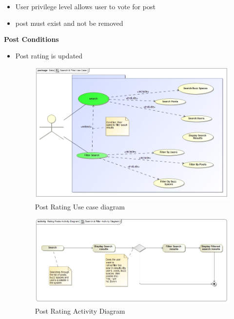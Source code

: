 \documentclass[11pt]{article}
\begin{document}
\begin{enumerate}
\begin{itemize}
\begin{itemize}
	  \item User privilege level allows user to vote for post
	  \item post must exist and not be removed
	  \end{itemize}
	  \textbf{Post Conditions}
	  \begin{itemize}
	  \item Post rating is updated
	  
	  \graphicspath{ {../Diagrams/Sphe/PostRatings/} }
	  \begin{figure}[H]	
    	\includegraphics[scale=0.5]{UseCase.jpg}
    	\caption{Post Rating Use case diagram}
    	
    	
	\end{figure}
	\graphicspath{ {../Diagrams/Sphe/PostRatings/} }
	  \begin{figure}[H]	
    	\includegraphics[scale=0.5]{ActivityDiagram.jpg}
    	\caption{Post Rating Activity Diagram}
	\end{figure}
	

\end{itemize}
\end{itemize}
\end{enumerate}
\end{document}

